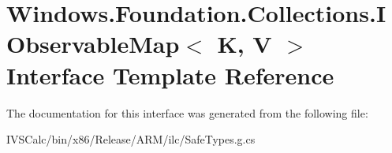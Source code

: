 \hypertarget{interface_windows_1_1_foundation_1_1_collections_1_1_i_observable_map}{}\section{Windows.\+Foundation.\+Collections.\+I\+Observable\+Map$<$ K, V $>$ Interface Template Reference}
\label{interface_windows_1_1_foundation_1_1_collections_1_1_i_observable_map}


The documentation for this interface was generated from the following file\+:\begin{DoxyCompactItemize}
\item 
I\+V\+S\+Calc/bin/x86/\+Release/\+A\+R\+M/ilc/Safe\+Types.\+g.\+cs\end{DoxyCompactItemize}
